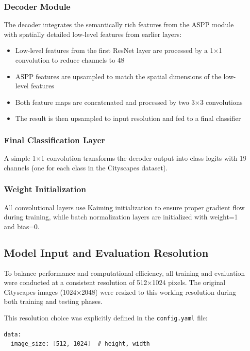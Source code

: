 \documentclass[]{article}
\begin{document}
\subsubsection{Decoder Module}
The decoder integrates the semantically rich features from the ASPP module with spatially detailed low-level features from earlier layers:
\begin{itemize}
    \item Low-level features from the first ResNet layer are processed by a 1×1 convolution to reduce channels to 48
    \item ASPP features are upsampled to match the spatial dimensions of the low-level features
    \item Both feature maps are concatenated and processed by two 3×3 convolutions
    \item The result is then upsampled to input resolution and fed to a final classifier
\end{itemize}

\subsubsection{Final Classification Layer}
A simple 1×1 convolution transforms the decoder output into class logits with 19 channels (one for each class in the Cityscapes dataset).

\subsubsection{Weight Initialization}
All convolutional layers use Kaiming initialization to ensure proper gradient flow during training, while batch normalization layers are initialized with weight=1 and bias=0.



\subsection{Model Input and Evaluation Resolution}
To balance performance and computational efficiency, all training and evaluation were conducted at a consistent resolution of 512×1024 pixels. The original Cityscapes images (1024×2048) were resized to this working resolution during both training and testing phases.

This resolution choice was explicitly defined in the \texttt{config.yaml} file:
\begin{verbatim}
data:
  image_size: [512, 1024]  # height, width
\end{verbatim}
\end{document}
